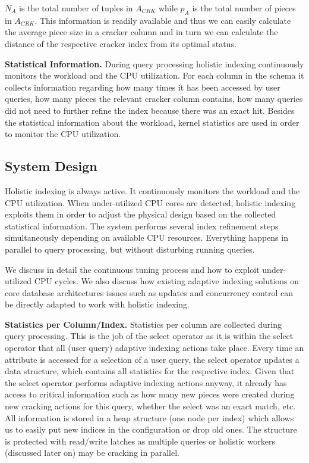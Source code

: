 $N_A$ is the total number of tuples in $A_{CRK}$ while $p_A$ is the total number of pieces in $A_{CRK}$.
This information is readily available and thus we can easily calculate the average piece size
in a cracker column and in turn we can calculate the distance of the respective cracker index from its optimal status.

\textbf{Statistical Information.} 
During query processing holistic indexing continuously monitors the workload and the CPU utilization.
For each column in the schema it collects information regarding how many times it has been accessed by user queries,
how many pieces the relevant cracker column contains, how many queries did not need to further refine the index
because there was an exact hit.
Besides the statistical information about the workload, kernel statistics are used in order to monitor the CPU utilization.


\subsection{System Design}
\label{subsec:design}

Holistic indexing is always active.
It continuously monitors the workload and the CPU utilization.
When under-utilized CPU cores are detected, holistic indexing exploits them in order to adjust the physical design based
on the collected statistical information.
The system performs several index refinement steps simultaneously depending on available CPU resources. 
Everything happens in parallel to query processing, but without disturbing running queries.


We discuss in detail the continuous tuning process and how to exploit under-utilized CPU cycles. We also discuss how existing adaptive indexing solutions on %
 core database architectures issues%
 such as updates and concurrency control can be directly adapted to work with holistic indexing.


\textbf{Statistics per Column/Index.}
Statistics per column are collected during query processing.
This is the job of the select operator as it is within the select operator that all (user query) 
adaptive indexing actions take place.  
Every time an attribute is accessed for a selection of a user query, the select operator
updates a data structure, which contains all statistics for the respective index.
Given that the select operator performs adaptive indexing actions anyway,
it already has access to critical information such as how many new pieces were created 
during new cracking actions for this query,
whether the select was an exact match, etc.
All information is stored in a heap structure (one node per index) 
which allows us to easily put new indices in the configuration or drop old ones.
The structure is protected with read/write latches as multiple queries  or holistic workers (discussed later on) 
may be cracking in parallel.


